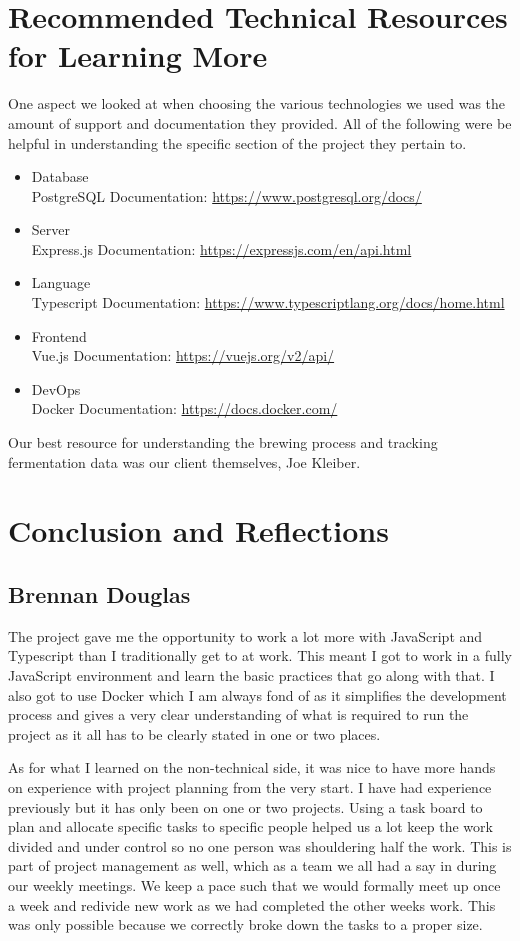 \documentclass[draftclsnofoot,onecolumn,journal,letterpaper,compsoc,10pt]{IEEEtran}
\begin{document}
\section{Recommended Technical Resources for Learning More}
One aspect we looked at when choosing the various technologies we used was the amount of support and documentation they provided. All of the following were be helpful in understanding the specific section of the project they pertain to.
\begin{itemize}
    \item Database\\
        PostgreSQL Documentation: \url{https://www.postgresql.org/docs/}
    \item Server\\
        Express.js Documentation: \url{https://expressjs.com/en/api.html}
    \item Language\\ 
        Typescript Documentation: \url{https://www.typescriptlang.org/docs/home.html}
    \item Frontend\\ 
        Vue.js Documentation: \url{https://vuejs.org/v2/api/}
    \item DevOps\\ 
        Docker Documentation: \url{https://docs.docker.com/}
\end{itemize}

Our best resource for understanding the brewing process and tracking fermentation data was our client themselves, Joe Kleiber.

\newpage
\section{Conclusion and Reflections}
\subsection{Brennan Douglas}
The project gave me the opportunity to work a lot more with JavaScript and Typescript than I traditionally get to at work.  This meant I got to work in a fully JavaScript environment and learn the basic practices that go along with that.  I also got to use Docker which I am always fond of as it simplifies the development process and gives a very clear understanding of what is required to run the project as it all has to be clearly stated in one or two places.

As for what I learned on the non-technical side, it was nice to have more hands on experience with project planning from the very start.  I have had experience previously but it has only been on one or two projects.  Using a task board to plan and allocate specific tasks to specific people helped us a lot keep the work divided and under control so no one person was shouldering half the work.  This is part of project management as well, which as a team we all had a say in during our weekly meetings.  We keep a pace such that we would formally meet up once a week and redivide new work as we had completed the other weeks work.  This was only possible because we correctly broke down the tasks to a proper size.
\end{document}
